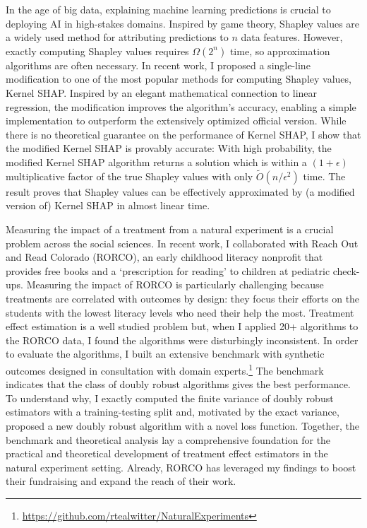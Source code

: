 \documentclass[11pt]{article}
\begin{document}
In the age of big data, explaining machine learning predictions is crucial to deploying AI in high-stakes domains.
Inspired by game theory, Shapley values are a widely used method for attributing predictions to $n$ data features.
However, exactly computing Shapley values requires $\Omega(2^n)$ time, so approximation algorithms are often necessary.
In recent work, I proposed a single-line modification to one of the most popular methods for computing Shapley values, Kernel SHAP.
Inspired by an elegant mathematical connection to linear regression, the modification improves the algorithm's accuracy, enabling a simple implementation to outperform the extensively optimized official version.
While there is no theoretical guarantee on the performance of Kernel SHAP, I show that the modified Kernel SHAP is provably accurate:
With high probability, the modified Kernel SHAP algorithm returns a solution which is within a $(1+\epsilon)$ multiplicative factor of the true Shapley values with only $\tilde{O}(n/\epsilon^2)$ time.
The result proves that Shapley values can be effectively approximated by (a modified version of) Kernel SHAP in almost linear time.

Measuring the impact of a treatment from a natural experiment is a crucial problem across the social sciences.
In recent work, I collaborated with Reach Out and Read Colorado (RORCO), an early childhood literacy nonprofit that provides free books and a `prescription for reading' to children at pediatric check-ups.
Measuring the impact of RORCO is particularly challenging because treatments are correlated with outcomes by design: they focus their efforts on the students with the lowest literacy levels who need their help the most.
Treatment effect estimation is a well studied problem but, when I applied 20+ algorithms to the RORCO data, I found the algorithms were disturbingly inconsistent.
In order to evaluate the algorithms, I built an extensive benchmark with synthetic outcomes designed in consultation with domain experts.\footnote{\url{https://github.com/rtealwitter/NaturalExperiments}}
The benchmark indicates that the class of doubly robust algorithms gives the best performance.
To understand why, I exactly computed the finite variance of doubly robust estimators with a training-testing split and, motivated by the exact variance, proposed a new doubly robust algorithm with a novel loss function.
Together, the benchmark and theoretical analysis lay a comprehensive foundation for the practical and theoretical development of treatment effect estimators in the natural experiment setting.
Already, RORCO has leveraged my findings to boost their fundraising and expand the reach of their work.
\end{document}
